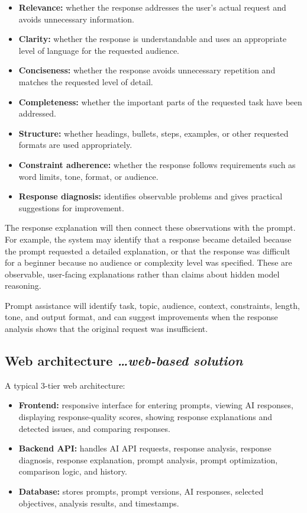 \documentclass[11pt,a4paper]{article}
\newcommand{\BvrHint}[1]{%
  {\normalfont\normalsize\itshape\hfill #1}}
\begin{document}
\begin{itemize}[leftmargin=0.7cm]
    \item \textbf{Relevance:} whether the response addresses the user's
    actual request and avoids unnecessary information.
    \item \textbf{Clarity:} whether the response is understandable and uses
    an appropriate level of language for the requested audience.
    \item \textbf{Conciseness:} whether the response avoids unnecessary
    repetition and matches the requested level of detail.
    \item \textbf{Completeness:} whether the important parts of the requested
    task have been addressed.
    \item \textbf{Structure:} whether headings, bullets, steps, examples, or
    other requested formats are used appropriately.
    \item \textbf{Constraint adherence:} whether the response follows
    requirements such as word limits, tone, format, or audience.
    \item \textbf{Response diagnosis:} identifies observable problems and
    gives practical suggestions for improvement.
\end{itemize}

The response explanation will then connect these observations with the
prompt. For example, the system may identify that a response became detailed
because the prompt requested a detailed explanation, or that the response
was difficult for a beginner because no audience or complexity level was
specified. These are observable, user-facing explanations rather than claims
about hidden model reasoning.

Prompt assistance will identify task, topic, audience, context, constraints,
length, tone, and output format, and can suggest improvements when the
response analysis shows that the original request was insufficient.

\subsection{Web architecture%
  \BvrHint{\ldots web-based solution}}

A typical 3-tier web architecture:

\begin{itemize}[leftmargin=0.7cm]
    \item \textbf{Frontend:} responsive interface for entering prompts,
    viewing AI responses, displaying response-quality scores, showing
    response explanations and detected issues, and comparing responses.
    \item \textbf{Backend API:} handles AI API requests, response analysis,
    response diagnosis, response explanation, prompt analysis, prompt
    optimization, comparison logic, and history.
    \item \textbf{Database:} stores prompts, prompt versions, AI responses,
    selected objectives, analysis results, and timestamps.
\end{itemize}
\end{document}

